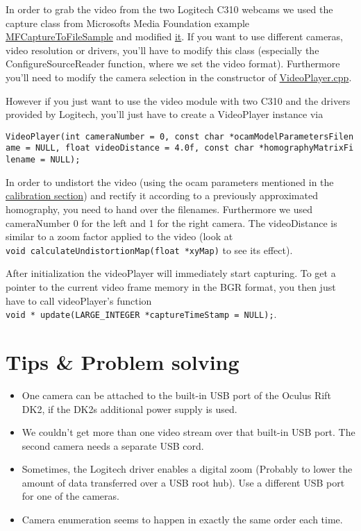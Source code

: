 In order to grab the video from the two Logitech C310 webcams we used the capture
class from Microsofts Media Foundation example
\href{https://msdn.microsoft.com/en-us/library/windows/desktop/ee663604\%28v=vs.85\%29.aspx}{MFCaptureToFileSample}
and modified
\href{https://github.com/ands/OculusMeetsAR/blob/master/ARLib/src/Video/CCapture.cpp}{it}.
If you want to use different cameras, video resolution or drivers,
you'll have to modify this class (especially the ConfigureSourceReader
function, where we set the video format). Furthermore you'll need to
modify the camera selection in the constructor of
\href{https://github.com/ands/OculusMeetsAR/blob/master/ARLib/src/Video/videoplayer.cpp}{VideoPlayer.cpp}.

However if you just want to use the video module with two C310 and the
drivers provided by Logitech, you'll just have to create a VideoPlayer
instance via

\texttt{VideoPlayer(int\ cameraNumber\ =\ 0,\ const\ char\ *ocamModelParametersFilename\ =\ NULL,\ float\ videoDistance\ =\ 4.0f,\ const\ char\ *homographyMatrixFilename\ =\ NULL);}

In order to undistort the video (using the ocam parameters mentioned in
the \hyperref[sec:stereo_calibration]{calibration section}) and rectify it according to a previously approximated homography, you need to hand over the filenames. Furthermore we used cameraNumber 0 for the left and 1 for the right camera. The videoDistance is similar to a zoom factor applied to the video (look at \texttt{void\ calculateUndistortionMap(float\ *xyMap)} to see its effect).

After initialization the videoPlayer will immediately start capturing. To get a pointer to the current video frame memory in the BGR format, you then just have to call videoPlayer's function
\texttt{void\ *\ update(LARGE\_INTEGER\ *captureTimeStamp\ =\ NULL);}.

\section{Tips \& Problem solving}\label{tips-problem-solving}

\begin{itemize}
\itemsep1pt\parskip0pt
\item
  One camera can be attached to the built-in USB port of the Oculus Rift DK2, if the DK2s additional power supply is used.
\item
  We couldn't get more than one video stream over that built-in USB port. The second camera needs a separate USB cord.
\item
  Sometimes, the Logitech driver enables a digital zoom (Probably to lower the amount of data transferred over a USB root hub). Use a different USB port for one of the cameras.
\item
  Camera enumeration seems to happen in exactly the same order each time.
\end{itemize}